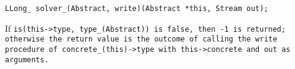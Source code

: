 
\tt{LLong_ solver_(Abstract, write)(Abstract *this, Stream out);}


If \tt{is(this->type, type_(Abstract))} is \tt{false}, then \tt{-1} is returned;
otherwise the return value is the outcome of calling the \tt{write} procedure of
\tt{concrete_(this)->type} with \tt{this->concrete} and \tt{out} as arguments.
